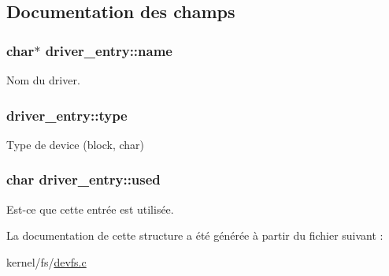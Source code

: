 \subsection{Documentation des champs}
\hypertarget{structdriver__entry_afc014b612d6cedf602aab7255d4576c1}{
\subsubsection[{name}]{\setlength{\rightskip}{0pt plus 5cm}char$\ast$ driver\+\_\+entry\+::name}}\label{structdriver__entry_afc014b612d6cedf602aab7255d4576c1}
Nom du driver. \hypertarget{structdriver__entry_a3d74a551a1bbb2f2583ba058877b52a4}{
\subsubsection[{type}]{ driver\+\_\+entry\+::type}}\label{structdriver__entry_a3d74a551a1bbb2f2583ba058877b52a4}
Type de device (block, char) \hypertarget{structdriver__entry_a9a2a74aad52e09fb03bef9703530e28f}{
\subsubsection[{used}]{\setlength{\rightskip}{0pt plus 5cm}char driver\+\_\+entry\+::used}}\label{structdriver__entry_a9a2a74aad52e09fb03bef9703530e28f}
Est-\/ce que cette entrée est utilisée. 

La documentation de cette structure a été générée à partir du fichier suivant \+:\begin{DoxyCompactItemize}
\item 
kernel/fs/\hyperlink{devfs_8c}{devfs.\+c}\end{DoxyCompactItemize}
